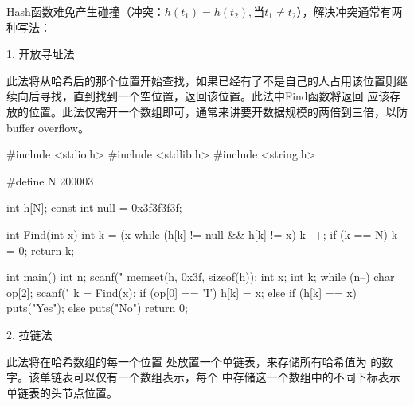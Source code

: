 Hash函数难免产生碰撞（冲突：$h(t_1) = h(t_2), \text{当} t_1 \neq t_2$），解决冲突通常有两种写法：

1. 开放寻址法

此法将从哈希后的那个位置开始查找，如果已经有了不是自己的人占用该位置则继续向后寻找，直到找到一个空位置，返回该位置。此法中Find函数将返回 应该存放的位置。此法仅需开一个数组即可，通常来讲要开数据规模的两倍到三倍，以防buffer overflow。

\begin{mycpptwocol}[开放寻址法]
    #include <stdio.h>
    #include <stdlib.h>
    #include <string.h>

    #define N 200003

    int h[N];
    const int null = 0x3f3f3f3f;

    int Find(int x) {
        int k = (x %
        while (h[k] != null && h[k] != x) {
            k++;
            if (k == N) {
                k = 0;
            }
        }
        return k;
    }

    int main() {
        int n;
        scanf("%
        memset(h, 0x3f, sizeof(h));
        int x;
        int k;
        while (n--) {
            char op[2];
            scanf("%
            k = Find(x);
            if (op[0] == 'I') {
                h[k] = x;
            } else {
                if (h[k] == x) {
                    puts("Yes");
                } else {
                    puts("No")
                }
            }
        }
        return 0;
    }
\end{mycpptwocol}

2. 拉链法

此法将在哈希数组的每一个位置  处放置一个单链表，来存储所有哈希值为  的数字。该单链表可以仅有一个数组表示，每个  中存储这一个数组中的不同下标表示单链表的头节点位置。

